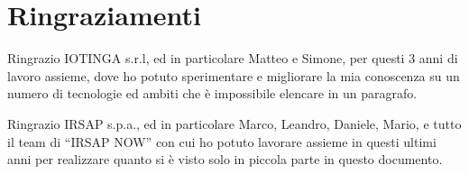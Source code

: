 \documentclass[12pt,a4paper,twoside,titlepage]{book}
\begin{document}
\section{Ringraziamenti}

Ringrazio IOTINGA s.r.l, ed in particolare Matteo e Simone, per questi 3 anni di
lavoro assieme, dove ho potuto sperimentare e migliorare la mia conoscenza su un
numero di tecnologie ed ambiti che è impossibile elencare in un paragrafo.

Ringrazio IRSAP s.p.a., ed in particolare Marco, Leandro, Daniele, Mario, e tutto il team
di ``IRSAP NOW'' con cui ho potuto lavorare assieme in questi ultimi anni per realizzare
quanto si è visto solo in piccola parte in questo documento.
\end{document}
